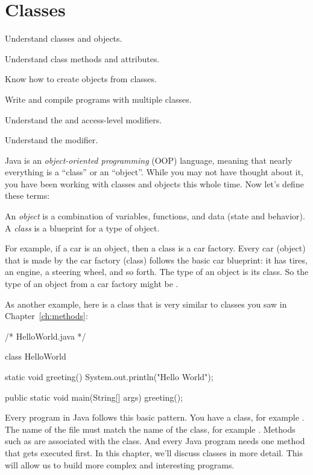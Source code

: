 \chapter{Classes}
\label{ch:classes}

\begin{goals}
\item Understand classes and objects.
\item Understand class methods and attributes.
\item Know how to create objects from classes.
\item Write and compile programs with multiple classes.
\item Understand the  and  access-level modifiers.
\item Understand the  modifier.
\end{goals}

Java is an \emph{object-oriented programming} (OOP) language, meaning that nearly everything is a ``class'' or an ``object''. While you may not have thought about it, you have been working with classes and objects this whole time. Now let's define these terms:

\begin{definition}
An \emph{object} is a combination of variables, functions, and data (state and behavior). A \emph{class} is a blueprint for a type of object.
\end{definition}

For example, if a car is an object, then a class is a car factory. Every car (object) that is made by the car factory (class) follows the basic car blueprint: it has tires, an engine, a steering wheel, and so forth. The type of an object is its class. So the type of an object from a car factory might be .

As another example, here is a class that is very similar to classes you saw in Chapter~\ref{ch:methods}:

\begin{code}
/* HelloWorld.java */

class HelloWorld {

    static void greeting() {
        System.out.println("Hello World");
    } 

    public static void main(String[] args) {
        greeting();
    }
}
\end{code}

Every program in Java follows this basic pattern. You have a class, for example . The name of the file must match the name of the class, for example . Methods such as  are associated with the class. And every Java program needs one  method that gets executed first. In this chapter, we'll discuss classes in more detail. This will allow us to build more complex and interesting programs.

